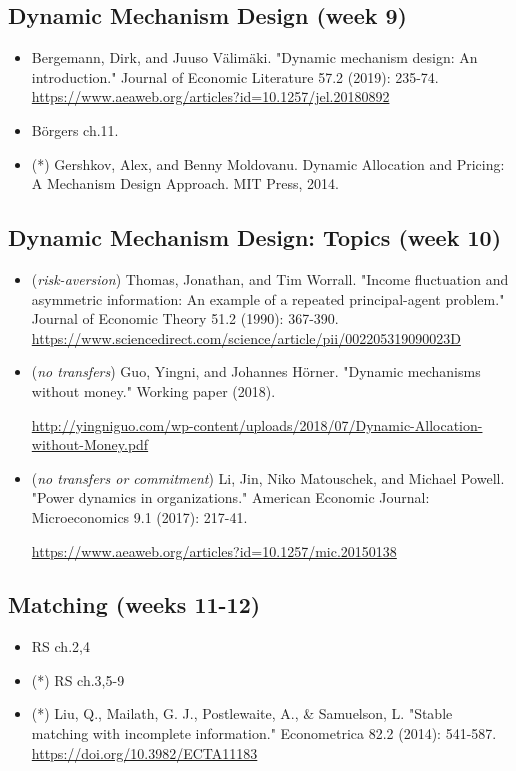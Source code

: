 \documentclass{article}
\begin{document}
\subsection{Dynamic Mechanism Design (week 9)}
\begin{itemize}
	\item Bergemann, Dirk, and Juuso Välimäki. "Dynamic mechanism design: An introduction." Journal of Economic Literature 57.2 (2019): 235-74. \url{https://www.aeaweb.org/articles?id=10.1257/jel.20180892}
	\item B{\"o}rgers ch.11.
	\item (*) Gershkov, Alex, and Benny Moldovanu. Dynamic Allocation and Pricing: A Mechanism Design Approach. MIT Press, 2014. 
\end{itemize}

\subsection{Dynamic Mechanism Design: Topics (week 10)}
\begin{itemize}
	\item (\emph{risk-aversion}) Thomas, Jonathan, and Tim Worrall. "Income fluctuation and asymmetric information: An example of a repeated principal-agent problem." Journal of Economic Theory 51.2 (1990): 367-390. \url{https://www.sciencedirect.com/science/article/pii/002205319090023D}
	\item (\emph{no transfers}) Guo, Yingni, and Johannes Hörner. "Dynamic mechanisms without money." Working paper (2018). 
	
	\url{http://yingniguo.com/wp-content/uploads/2018/07/Dynamic-Allocation-without-Money.pdf}
	\item (\emph{no transfers or commitment}) Li, Jin, Niko Matouschek, and Michael Powell. "Power dynamics in organizations." American Economic Journal: Microeconomics 9.1 (2017): 217-41.
	
	\url{https://www.aeaweb.org/articles?id=10.1257/mic.20150138}
\end{itemize}

\subsection{Matching (weeks 11-12)}
\begin{itemize}
	\item RS ch.2,4
	\item (*) RS ch.3,5-9
	\item (*) Liu, Q., Mailath, G. J., Postlewaite, A., \& Samuelson, L.  "Stable matching with incomplete information." Econometrica 82.2 (2014): 541-587. \url{https://doi.org/10.3982/ECTA11183}
\end{itemize}
\end{document}
